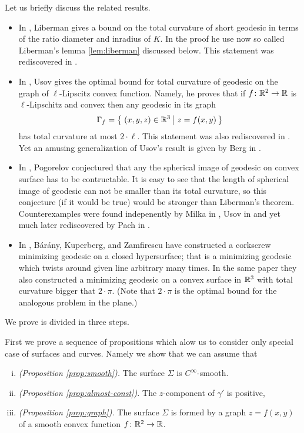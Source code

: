 \documentclass[a4paper,10pt]{amsart}
\begin{document}
Let us briefly discuss the related results.

\begin{itemize}
\item In \cite{liberman}, Liberman gives a bound on the total curvature of short geodesic in terms of the ratio diameter and inradius of $K$.
In the proof he use now so called Liberman's lemma \ref{lem:liberman} discussed below.
This statement was rediscovered in \cite{BKZ}.
\item In \cite{usov}, 
Usov gives the optimal bound for total curvature of geodesic on the graph of $\ell$-Lipscitz convex function. 
Namely, he proves that if $f\colon\mathbb{R}^2\to\mathbb{R}$ is $\ell$-Lipschitz and convex then any 
geodesic in its graph 
\[\Gamma_f=\set{(x,y,z)\in \RR^3}{z=f(x,y)}\] 
has total curvature at most $2\cdot \ell$.
This statement was also rediscovered in \cite{BKZ}.
Yet an amusing generalization of Usov's result is given by Berg in \cite{berg}.
\item In \cite{pogorelov}, Pogorelov conjectured that any the spherical image of geodesic on convex surface has to be contructable.
It is easy to see that the length of spherical image of geodesic can not be smaller than its total curvature, 
so this conjecture (if it would be true) 
would be stronger than Liberman's theorem.
Counterexamples were found indepenently by Milka in \cite{milka}, 
Usov in \cite{usov-conj-pog} 
and yet much later rediscovered by Pach in \cite{pach}.
\item In \cite{BKZ},
B{\'a}r{\'a}ny,
Kuperberg, 
and Zamfirescu 
have constructed a corkscrew minimizing geodesic on a closed hypersurface;
that is a minimizing geodesic which twists around given line arbitrary many times.
In the same paper they also constructed a minimizing geodesic on a convex surface in $\mathbb{R}^3$
with total curvature bigger that $2\cdot\pi$.
(Note that $2\cdot\pi$ is the optimal bound for the analogous problem in the plane.)
\end{itemize}

We prove is divided in three steps.

First we prove a sequence of propositions which alow us to consider only special case of surfaces and curves.
Namely we show that we can assume that
\begin{enumerate}[(i)]
\item\label{smooth}{\it (Proposition \ref{prop:smooth}).} 
The surface $\Sigma$ is $C^\infty$-smooth.
\item{\it (Proposition \ref{prop:almost-const}).}  The $z$-component of $\gamma'$ is positive,
\item\label{graph}{\it (Proposition \ref{prop:graph}).} The surface $\Sigma$ is formed by a graph $z=f(x,y)$ of a smooth convex function $f\colon\mathbb{R}^2\to \mathbb{R}$.
\end{enumerate}
\end{document}
